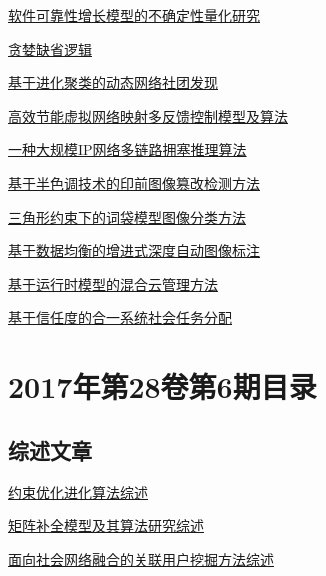 \documentclass[a4paper]{article}
\begin{document}
\href{http://www.jos.org.cn/ch/reader/create_pdf.aspx?file_no=5108&year_id=2017&quarter_id=7&falg=1}{软件可靠性增长模型的不确定性量化研究}

\href{http://www.jos.org.cn/ch/reader/create_pdf.aspx?file_no=5066&year_id=2017&quarter_id=7&falg=1}{贪婪缺省逻辑}

\href{http://www.jos.org.cn/ch/reader/create_pdf.aspx?file_no=5114&year_id=2017&quarter_id=7&falg=1}{基于进化聚类的动态网络社团发现}

\href{http://www.jos.org.cn/ch/reader/create_pdf.aspx?file_no=5062&year_id=2017&quarter_id=7&falg=1}{高效节能虚拟网络映射多反馈控制模型及算法}

\href{http://www.jos.org.cn/ch/reader/create_pdf.aspx?file_no=5111&year_id=2017&quarter_id=7&falg=1}{一种大规模IP网络多链路拥塞推理算法}

\href{http://www.jos.org.cn/ch/reader/create_pdf.aspx?file_no=5067&year_id=2017&quarter_id=7&falg=1}{基于半色调技术的印前图像篡改检测方法}

\href{http://www.jos.org.cn/ch/reader/create_pdf.aspx?file_no=5069&year_id=2017&quarter_id=7&falg=1}{三角形约束下的词袋模型图像分类方法}

\href{http://www.jos.org.cn/ch/reader/create_pdf.aspx?file_no=5112&year_id=2017&quarter_id=7&falg=1}{基于数据均衡的增进式深度自动图像标注}

\href{http://www.jos.org.cn/ch/reader/create_pdf.aspx?file_no=5113&year_id=2017&quarter_id=7&falg=1}{基于运行时模型的混合云管理方法}

\href{http://www.jos.org.cn/ch/reader/create_pdf.aspx?file_no=5109&year_id=2017&quarter_id=7&falg=1}{基于信任度的合一系统社会任务分配}


\section{\textbf{2017年第28卷第6期目录}}
\subsection{综述文章}
\href{http://www.jos.org.cn/ch/reader/create_pdf.aspx?file_no=5259&year_id=2017&quarter_id=6&falg=1}{约束优化进化算法综述}

\href{http://www.jos.org.cn/ch/reader/create_pdf.aspx?file_no=5260&year_id=2017&quarter_id=6&falg=1}{矩阵补全模型及其算法研究综述}

\href{http://www.jos.org.cn/ch/reader/create_pdf.aspx?file_no=5249&year_id=2017&quarter_id=6&falg=1}{面向社会网络融合的关联用户挖掘方法综述}
\end{document}
